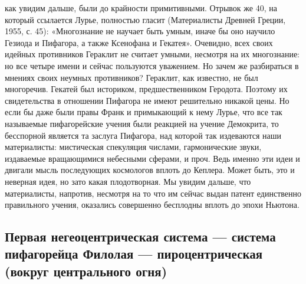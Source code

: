 как  увидим дальше,  были до  крайности примитивными.  Отрывок же  40,
на  который ссылается  Лурье, полностью  гласит (Материалисты  Древней
Греции, 1955, с. 45): «Многознание не научает быть умным, иначе бы оно
научило Гезиода  и Пифагора, а  также Ксенофана и  Гекатея». Очевидно,
всех своих идейных противников Гераклит не считает умными, несмотря на
их многознание:  но все  четыре имени  и сейчас  пользуются уважением.
Но  зачем   же  разбираться  в  мнениях   своих  неумных  противников?
Гераклит,  как известно,  не  был многоречив.  Гекатей был  историком,
предшественником  Геродота.  Поэтому   их  свидетельства  в  отношении
Пифагора не имеют решительно никакой цены.  Но если бы даже были правы
Франк и примыкающий к нему Лурье, что все так называемые пифагорейские
учения были  реакцией на учение  Демокрита, то бесспорной  является та
заслуга  Пифагора,  над  которой  так  издеваются  наши  материалисты:
мистическая  спекуляция   числами,  гармонические   звуки,  издаваемые
вращающимися небесными сферами, и проч. Ведь именно эти идеи и двигали
мысль  последующих космологов  вплоть до  Кеплера. Может  быть, это  и
неверная  идея, но  зато  какая плодотворная.  Мы  увидим дальше,  что
материалисты,  напротив, несмотря  на то  что им  сейчас выдан  патент
единственно правильного учения,  оказались совершенно бесплодны вплоть
до эпохи Ньютона.

\subsection{Первая негеоцентрическая  система ---  система пифагорейца
Филолая --- пироцентрическая (вокруг центрального огня)}

